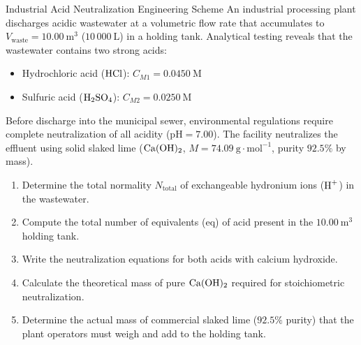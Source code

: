 \begin{exercise}{Industrial Acid Neutralization Engineering Scheme}
An industrial processing plant discharges acidic wastewater at a volumetric flow rate that accumulates to $V_{\text{waste}} = 10.00\ \mathrm{m^3}$ ($10\,000\ \mathrm{L}$) in a holding tank. Analytical testing reveals that the wastewater contains two strong acids:
\begin{itemize}[itemsep=1pt]
  \item Hydrochloric acid ($\ce{HCl}$): $C_{M1} = 0.0450\ \mathrm{M}$
  \item Sulfuric acid ($\ce{H2SO4}$): $C_{M2} = 0.0250\ \mathrm{M}$
\end{itemize}
Before discharge into the municipal sewer, environmental regulations require complete neutralization of all acidity ($\mathrm{pH} = 7.00$). The facility neutralizes the effluent using solid slaked lime ($\ce{Ca(OH)2}$, $M = 74.09\ \mathrm{g\cdot mol^{-1}}$, purity $92.5\%$ by mass).
\begin{enumerate}[leftmargin=1.5em,itemsep=2pt]
  \item Determine the total normality $N_{\text{total}}$ of exchangeable hydronium ions ($\ce{H+}$) in the wastewater.
  \item Compute the total number of equivalents ($\mathrm{eq}$) of acid present in the $10.00\ \mathrm{m^3}$ holding tank.
  \item Write the neutralization equations for both acids with calcium hydroxide.
  \item Calculate the theoretical mass of pure $\ce{Ca(OH)2}$ required for stoichiometric neutralization.
  \item Determine the actual mass of commercial slaked lime ($92.5\%$ purity) that the plant operators must weigh and add to the holding tank.
\end{enumerate}
\end{exercise}

\begin{tabletworkspace}[5.0cm]
\end{tabletworkspace}

